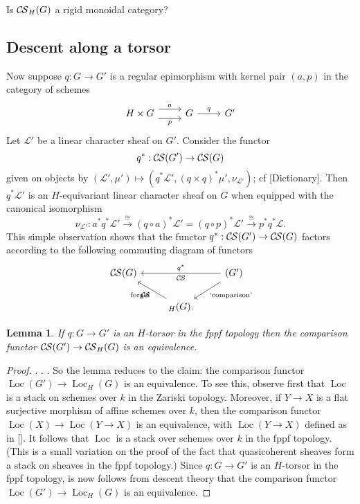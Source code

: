 \documentclass[10pt]{amsart}
\theoremstyle{plain}
\newtheorem{lemma}[theorem]{Lemma}
\theoremstyle{definition}
\newcommand{\Fq}{k}
\DeclareMathOperator{\Loc}{Loc}
\newcommand{\iso}{{\ \cong\ }}
\newcommand{\cs}[1]{{\mathcal{#1}}}
\newcommand{\CS}{{\mathcal{C\hskip-0.8pt S}}}
\begin{document}
Is $\CS_H(G)$ a rigid monoidal category?

\subsection{Descent along a torsor}

Now suppose $q : G \to G'$ is a regular epimorphism with kernel pair $(a,p)$ in the category of schemes
\[
\begin{tikzcd}
H\times G
 \arrow[shift left=2]{r}{a}
  \arrow[shift right=2,swap]{r}{p}
&
G 
\arrow{r}{q}
& 
G'
\end{tikzcd}
\]
Let $\cs{L}'$ be a linear character sheaf on $G'$.
Consider the functor
\[
q^* : \CS(G') \to \CS(G)
\]
given on objects by $(\cs{L}',\mu') \mapsto (q^*\cs{L}', (q\times q)^* \mu', \nu_{\cs{L}'})$; cf [Dictionary].
Then $q^*\cs{L}'$ is an $H$-equivariant linear character sheaf on $G$ when equipped with the canonical isomorphism
\[
\nu_{\cs{L}'} : a^* q^* \cs{L}' \mathop{\longrightarrow}\limits^{\iso} (q\circ a)^* \cs{L}' = (q\circ p)^*\cs{L}' \mathop{\longrightarrow}\limits^{\iso} p^* q^*\cs{L}.
\]
This simple observation shows that the functor $q^* : \CS(G') \to \CS(G)$  factors according to the following commuting diagram of functors
\[
\begin{tikzcd}
\CS(G) &&\arrow{ll}[swap]{q^*} 
\CS(G') \arrow{dl}{\text{`comparison'}}\\
& \arrow{ul}{\text{forget}} \CS_{H}(G). & 
\end{tikzcd}
\]

\begin{lemma}
If $q : G \to G'$ is an $H$-torsor in the fppf topology then the comparison functor $\CS(G') \to \CS_H(G)$ is an equivalence.
\end{lemma}

\begin{proof}
. . . 
So the lemma reduces to the claim: the comparison functor $\Loc(G') \to \Loc_H(G)$ is an equivalence. 
To see this, observe first that $\Loc$ is a stack on schemes over $\Fq$ in the Zariski topology.
Moreover, if $Y \to X$ is a flat surjective morphism of affine schemes over $\Fq$, then the comparison functor $\Loc(X) \to \Loc(Y\to X)$ is an equivalence, with $\Loc(Y\to X)$ defined as in [].
It follows that $\Loc$ is a stack over schemes over $\Fq$ in the fppf topology.
(This is a small variation on the proof of the fact that quasicoherent sheaves form a stack on sheaves in the fppf topology.)
Since $q : G\to G'$ is an $H$-torsor in the fppf topology, is now follows from descent theory that the comparison functor $\Loc(G') \to \Loc_H(G)$ is an equivalence.
\end{proof}
\end{document}
